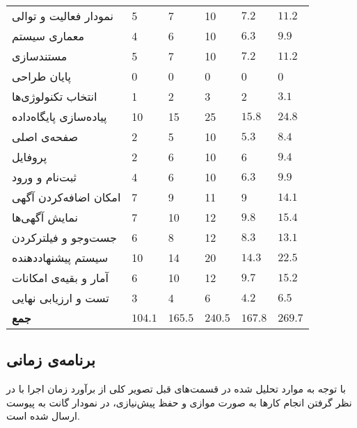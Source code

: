 \begin{table}[H]
{\begin{tabular}{|C{0.16666\textwidth}C{0.16666\textwidth}C{0.16666\textwidth}C{0.16666\textwidth}C{0.16666\textwidth}C{0.16666\textwidth}|}
			نمودار فعالیت و توالی & 5 & 7 & 10 & $7.2$ & $11.2$ \\ 
			معماری سیستم & 4 & 6 & 10 & $6.3$ & $9.9$ \\ 
			مستندسازی & 5 & 7 & 10 & $7.2$ & $11.2$ \\ 
			پایان طراحی & 0 & 0 & 0 & 0 & 0 \\ 
			انتخاب تکنولوژی‌ها & 1 & 2 & 3 & 2 & $3.1$ \\ 
			پیاده‌سازی پایگاه‌داده & 10 & 15 & 25 & $15.8$ & $24.8$ \\ 
			صفحه‌ی اصلی & 2 & 5 & 10 &$ 5.3$ & $8.4$ \\ 
			پروفایل & 2 & 6 & 10 & 6 & $9.4$ \\ 
			ثبت‌نام و ورود & 4 & 6 & 10 & $6.3$ & $9.9$ \\ 
			امکان اضافه‌کردن آگهی & 7 & 9 & 11 & 9 & $14.1$ \\ 
			نمایش آگهی‌ها & 7 & 10 & 12 & $9.8$ & $15.4$ \\ 
			جست‌وجو و فیلترکردن & 6 & 8 & 12 & $8.3$ & $13.1$ \\ 
			سیستم پیشنهاددهنده & 10 & 14 & 20 & $14.3$ & $22.5$ \\ 
			آمار و بقیه‌ی امکانات & 6 & 10 & 12 &$ 9.7$ &$ 15.2$ \\ 
			تست و ارزیابی نهایی & 3 & 4 & 6 &$ 4.2$ &$ 6.5$ \\ 
			\textbf{جمع} 
			& \textbf{$104.1$} & \textbf{$165.5$} & \textbf{$240.5$ }& \textbf{$167.8$} & \textbf{$269.7$} \\ 
			\hline
		\end{tabular}
	}
\end{table}

\renewcommand{\arraystretch}{1.7}

\subsection{برنامه‌ی زمانی}
با توجه به موارد تحلیل شده در قسمت‌های قبل تصویر کلی از برآورد زمان اجرا با در نظر گرفتن انجام کار‌ها به صورت موازی و حفظ پیش‌نیازی، در نمودار گانت
به پیوست ارسال شده است.

